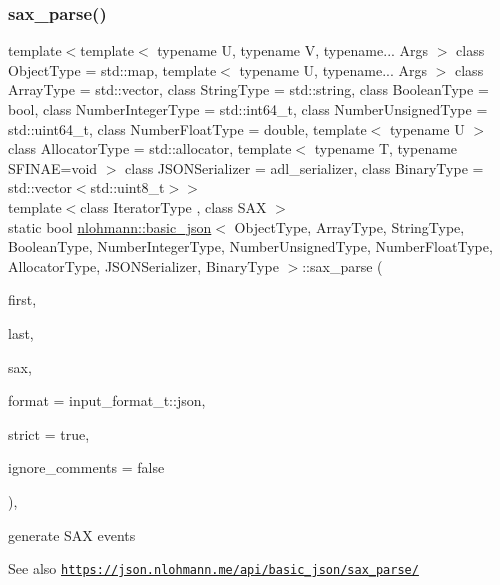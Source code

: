 \subsubsection{\texorpdfstring{sax\+\_\+parse()}{sax\_parse()}\hspace{0.1cm}{\footnotesize\ttfamily [2/3]}}
{\footnotesize\ttfamily template$<$template$<$ typename U, typename V, typename... Args $>$ class Object\+Type = std\+::map, template$<$ typename U, typename... Args $>$ class Array\+Type = std\+::vector, class String\+Type  = std\+::string, class Boolean\+Type  = bool, class Number\+Integer\+Type  = std\+::int64\+\_\+t, class Number\+Unsigned\+Type  = std\+::uint64\+\_\+t, class Number\+Float\+Type  = double, template$<$ typename U $>$ class Allocator\+Type = std\+::allocator, template$<$ typename T, typename S\+F\+I\+N\+A\+E=void $>$ class J\+S\+O\+N\+Serializer = adl\+\_\+serializer, class Binary\+Type  = std\+::vector$<$std\+::uint8\+\_\+t$>$$>$ \\
template$<$class Iterator\+Type , class S\+AX $>$ \\
static bool \hyperlink{classnlohmann_1_1basic__json}{nlohmann\+::basic\+\_\+json}$<$ Object\+Type, Array\+Type, String\+Type, Boolean\+Type, Number\+Integer\+Type, Number\+Unsigned\+Type, Number\+Float\+Type, Allocator\+Type, J\+S\+O\+N\+Serializer, Binary\+Type $>$\+::sax\+\_\+parse (\begin{DoxyParamCaption}\item[{Iterator\+Type}]{first,  }\item[{Iterator\+Type}]{last,  }\item[{S\+AX $\ast$}]{sax,  }\item[{\hyperlink{namespacenlohmann_1_1detail_aa554fc6a11519e4f347deb25a9f0db40}{input\+\_\+format\+\_\+t}}]{format = {\ttfamily input\+\_\+format\+\_\+t\+:\+:json},  }\item[{const bool}]{strict = {\ttfamily true},  }\item[{const bool}]{ignore\+\_\+comments = {\ttfamily false} }\end{DoxyParamCaption})\hspace{0.3cm}{\ttfamily [inline]}, {\ttfamily [static]}}



generate S\+AX events 

\begin{DoxySeeAlso}{See also}
\href{https://json.nlohmann.me/api/basic_json/sax_parse/}{\tt https\+://json.\+nlohmann.\+me/api/basic\+\_\+json/sax\+\_\+parse/} 
\end{DoxySeeAlso}
\mbox{\label{classnlohmann_1_1basic__json_aef9ef0a817ecde8bf270653e8706c150}} 
